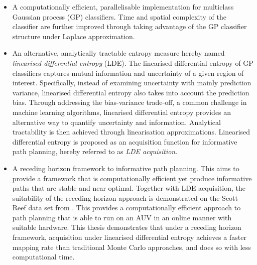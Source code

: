 		\begin{itemize}
		
			\item A computationally efficient, parallelisable implementation for multiclass Gaussian process (GP) classifiers. Time and spatial complexity of the classifier are further improved through taking advantage of the GP classifier structure under Laplace approximation.
			
			
			\item An alternative, analytically tractable entropy measure hereby named \textit{linearised differential entropy} (LDE). The linearised differential entropy of GP classifiers captures mutual information and uncertainty of a given region of interest. Specifically, instead of examining uncertainty with mainly prediction variance, linearised differential entropy also takes into account the prediction bias. Through addressing the bias-variance trade-off, a common challenge in machine learning algorithms, linearised differential entropy provides an alternative way to quantify uncertainty and information. Analytical tractability is then achieved through linearisation approximations. Linearised differential entropy is proposed as an acquisition function for informative path planning, hereby referred to as \textit{LDE acquisition}.
			
			\item A receding horizon framework to informative path planning. This aims to provide a framework that is computationally efficient yet produce informative paths that are stable and near optimal. Together with LDE acquisition, the suitability of the receding horizon approach is demonstrated on the Scott Reef data set from \cite{IMOS}. This provides a computationally efficient approach to path planning that is able to run on an AUV in an online manner with suitable hardware. This thesis demonstrates that under a receding horizon framework, acquisition under linearised differential entropy achieves a faster mapping rate than traditional Monte Carlo approaches, and does so with less computational time. 
			
		\end{itemize}
		
